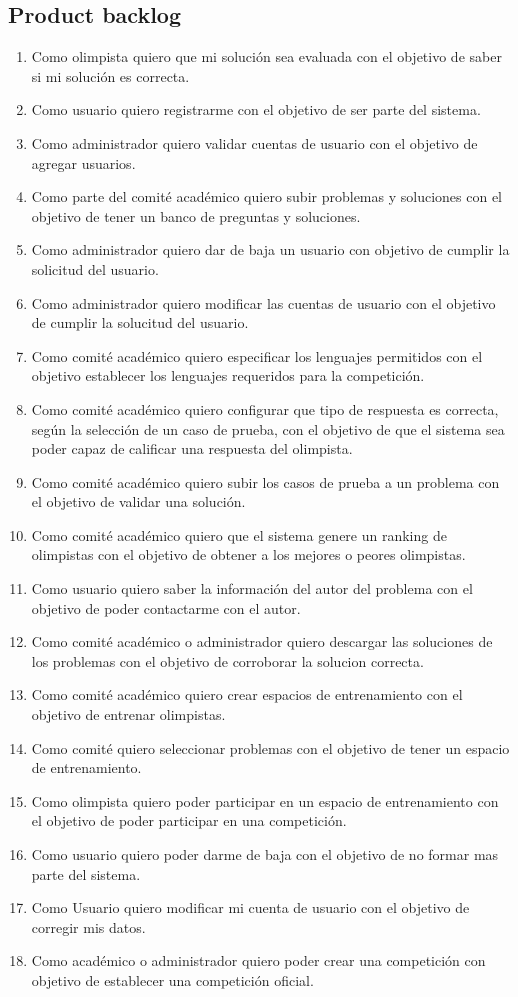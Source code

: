 \subsection{Product backlog}
\begin{enumerate}
\item Como olimpista quiero que mi soluci\'on sea evaluada con el objetivo de saber si mi soluci\'on es correcta.
\item Como usuario quiero registrarme con el objetivo de ser parte del sistema.
\item Como administrador quiero validar cuentas de usuario con el objetivo de agregar usuarios.
\item Como parte del comité académico quiero subir problemas y soluciones con el objetivo de tener un banco de preguntas y soluciones.
\item Como administrador quiero dar de baja un usuario con objetivo de cumplir la solicitud del usuario.
\item Como administrador quiero modificar las cuentas de usuario con el objetivo de cumplir la solucitud del usuario.
\item Como comité académico quiero especificar los lenguajes permitidos con el objetivo establecer los lenguajes requeridos para  la competición.
\item Como comité académico quiero configurar que tipo de respuesta es correcta, según la selección de un caso de prueba, con el objetivo de que el sistema sea poder capaz de calificar una respuesta del olimpista.
\item Como comité académico quiero subir los casos de prueba a un problema con el objetivo de validar una solución.
\item Como comité académico quiero que el sistema genere un ranking de olimpistas con el objetivo de obtener a los mejores o peores olimpistas.
\item Como usuario quiero saber la información del autor del problema con el objetivo de poder contactarme con el autor.
\item Como comité académico o administrador quiero descargar las soluciones de los problemas con el objetivo de corroborar la solucion correcta.
\item Como comité académico quiero crear espacios de entrenamiento con el objetivo de entrenar olimpistas.
\item Como comité quiero seleccionar problemas con el objetivo de tener un espacio de entrenamiento.
\item Como olimpista quiero poder participar en un espacio de entrenamiento con el objetivo de poder participar en una competición.
\item Como usuario quiero poder darme de baja con el objetivo de no formar mas parte del sistema.
\item Como Usuario quiero modificar mi cuenta de usuario con el objetivo de corregir mis datos.
\item Como académico o administrador quiero poder crear una competici\'on con objetivo de establecer una competici\'on oficial.
\end{enumerate}